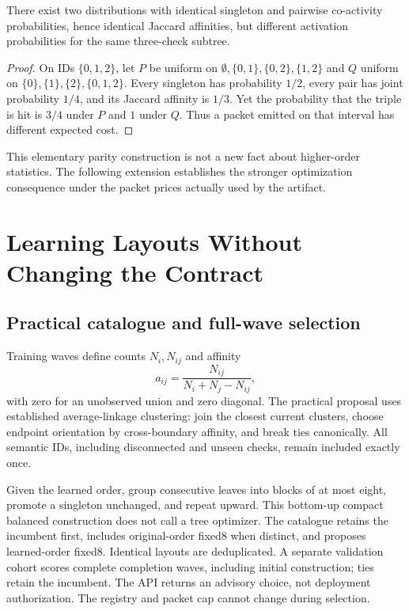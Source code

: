\documentclass[11pt]{article}
\theoremstyle{definition}\newtheorem{definition}[theorem]{Definition}
\begin{document}
\begin{proposition}\label{prop:pairwise}
There exist two distributions with identical singleton and pairwise co-activity probabilities, hence identical Jaccard affinities, but different activation probabilities for the same three-check subtree.
\end{proposition}
\begin{proof}
On IDs $\{0,1,2\}$, let $P$ be uniform on $\emptyset,\{0,1\},\{0,2\},\{1,2\}$ and $Q$ uniform on $\{0\},\{1\},\{2\},\{0,1,2\}$. Every singleton has probability $1/2$, every pair has joint probability $1/4$, and its Jaccard affinity is $1/3$. Yet the probability that the triple is hit is $3/4$ under $P$ and $1$ under $Q$. Thus a packet emitted on that interval has different expected cost.\end{proof}
This elementary parity construction is not a new fact about higher-order
statistics. The following extension establishes the stronger optimization
consequence under the packet prices actually used by the artifact.




\section{Learning Layouts Without Changing the Contract}\label{sec:compiler}
\subsection{Practical catalogue and full-wave selection}
Training waves define counts $N_i,N_{ij}$ and affinity
\begin{equation}
 a_{ij}=\frac{N_{ij}}{N_i+N_j-N_{ij}},
\end{equation}
with zero for an unobserved union and zero diagonal. The practical proposal uses established average-linkage clustering: join the closest current clusters, choose endpoint orientation by cross-boundary affinity, and break ties canonically. All semantic IDs, including disconnected and unseen checks, remain included exactly once.

Given the learned order, group consecutive leaves into blocks of at most eight, promote a singleton unchanged, and repeat upward. This bottom-up compact balanced construction does not call a tree optimizer. The catalogue retains the incumbent first, includes original-order fixed8 when distinct, and proposes learned-order fixed8. Identical layouts are deduplicated. A separate validation cohort scores complete completion waves, including initial construction; ties retain the incumbent. The API returns an advisory choice, not deployment authorization. The registry and packet cap cannot change during selection.
\end{document}
